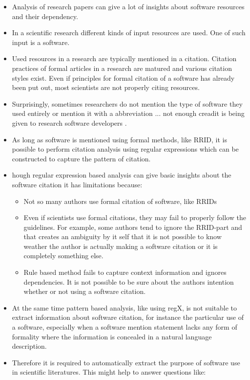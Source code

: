 \documentclass[12pt, a4paper]{article}
\begin{document}
\begin{itemize}
    \item Analysis of research papers can give a lot of insights about software resources and their dependency. 
    \item In a scientific research different kinds of input resources are used. One of such input is a software. 
    \item Used resources in a research are typically mentioned in a citation. Citation practices of formal articles in a research are matured and various citation styles exist. Even if principles  for formal citation of a software has already been put out, most scientists are not properly citing resources.  
	\item Surprisingly, sometimes researchers do not mention the type of software they used entirely or mention it with a abbreviation ... not enough creadit is being given to research software developers .
	\item As long as software is mentioned using formal methods, like RRID, it is possible to perform citation analysis using regular expressions which can be constructed to capture the pattern of citation.
	\item hough regular expression based analysis can give basic insights about the software citation it has limitations because:
			
			\begin{itemize}
				\item Not so many authors use formal citation of software, like RRIDs
				\item Even if scientists use formal citations, they may fail to properly follow the guidelines. For example, some authors tend to ignore the RRID-part and that creates an ambiguity by it self that it is not possible to know weather the author is actually making a software citation or it is completely something else. 
				\item Rule based method fails to capture context information and ignores dependencies. It is not possible to be sure about the authors intention whether or not using a software citation. 

			\end{itemize}

	\item At the same time pattern based analysis, like using regX, is not suitable to extract information about software citation, for instance the particular use of a software, especially when a software mention statement lacks any form of formality where the information is concealed in a natural language description. 
	\item Therefore it is required to automatically extract the purpose of software use in scientific literatures. This might help to answer questions like:
		

\end{itemize}
\end{document}
